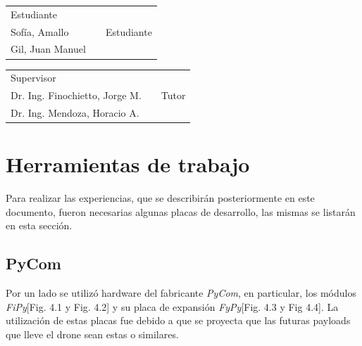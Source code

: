 \documentclass[12pt]{article}
\begin{document}
\vspace{1.5cm}
\begin{tabular}{p{5.5cm}cp{5.5cm}}
  \cline{1-1} \cline{3-3} \\
  \centering Estudiante   \\ Sofía, Amallo && \centering Estudiante \\ Gil, Juan Manuel
\end{tabular}

\vspace{1.5cm}

\begin{tabular}{p{5.5cm}cp{5.5cm}}
  \cline{1-1} \cline{3-3} \\
  \centering Supervisor   \\ Dr. Ing. Finochietto, Jorge M. && \centering Tutor \\ Dr. Ing. Mendoza, Horacio A.
\end{tabular}


\newpage
\section{Herramientas de trabajo}
\justifying
Para realizar las experiencias, que se describirán posteriormente en este documento, fueron necesarias algunas placas de desarrollo, las mismas se listarán en esta sección.
\subsection*{PyCom}
Por un lado se utilizó hardware del fabricante \textit{PyCom}, en particular, los módulos \textit{FiPy}[Fig. 4.1 y Fig. 4.2] y su placa de expansión \textit{FyPy}[Fig. 4.3 y Fig 4.4]. La utilización de estas placas fue debido a que se proyecta que las futuras payloads que lleve el drone sean estas o similares.
\end{document}
